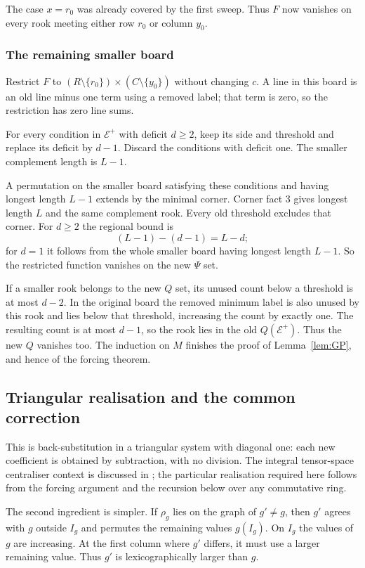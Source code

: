 The case $x=r_0$ was already covered by the first sweep. Thus $F$ now vanishes on every rook meeting either row $r_0$ or column $y_0$.

\subsubsection{The remaining smaller board}
Restrict $F$ to $(R\setminus\{r_0\})\times(C\setminus\{y_0\})$ without changing $c$. A line in this board is an old line minus one term using a removed label; that term is zero, so the restriction has zero line sums.

For every condition in $\mathcal E^+$ with deficit $d\ge2$, keep its side and threshold and replace its deficit by $d-1$. Discard the conditions with deficit one. The smaller complement length is $L-1$.

A permutation on the smaller board satisfying these conditions and having longest length $L-1$ extends by the minimal corner. Corner fact 3 gives longest length $L$ and the same complement rook. Every old threshold excludes that corner. For $d\ge2$ the regional bound is
\[(L-1)-(d-1)=L-d;
\]
for $d=1$ it follows from the whole smaller board having longest length $L-1$. So the restricted function vanishes on the new $\Psi$ set.

If a smaller rook belongs to the new $Q$ set, its unused count below a threshold is at most $d-2$. In the original board the removed minimum label is also unused by this rook and lies below that threshold, increasing the count by exactly one. The resulting count is at most $d-1$, so the rook lies in the old $Q(\mathcal E^+)$. Thus the new $Q$ vanishes too. The induction on $M$ finishes the proof of Lemma~\ref{lem:GP}, and hence of the forcing theorem.


\subsection{Triangular realisation and the common correction}\label{sec:realization}
This is back-substitution in a triangular system with diagonal one:
each new coefficient is obtained by subtraction, with no division.
The integral tensor-space centraliser context is discussed in
\cite{BDM}; the particular realisation required here follows from
the forcing argument and the recursion below over any commutative ring.

The second ingredient is simpler. If $\rho_g$ lies on the graph of $g'\ne g$, then $g'$ agrees with $g$ outside $I_g$ and permutes the remaining values $g(I_g)$. On $I_g$ the values of $g$ are increasing. At the first column where $g'$ differs, it must use a larger remaining value. Thus $g'$ is lexicographically larger than $g$.

